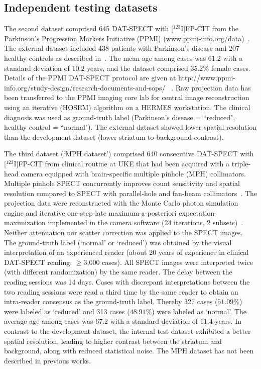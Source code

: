 \subsection{Independent testing datasets}
\label{subsec:external_dataset}

The second dataset comprised 645 DAT-SPECT with [$^{123}$I]FP-CIT from the Parkinson's Progression Markers Initiative (PPMI) 
(www.ppmi-info.org/data)~\citep{Parkinson_Progression_Marker_Initiative2011-px}.
The external dataset included 438 patients with Parkinson's disease and 207 healthy controls as described in~\cite{Wenzel2019}.
The mean age among cases was $61.2$ with a standard deviation of $10.2$ years, 
and the dataset comprised $35.2\%$ female cases.
Details of the PPMI DAT-SPECT protocol are given at http://www.ppmi-info.org/study-design/research-documents-and-sops/ ~\citep{Parkinson_Progression_Marker_Initiative2011-px}. 
Raw projection data has been transferred to the PPMI imaging core lab for central image reconstruction using an iterative (HOSEM) algorithm on a HERMES workstation. 
The clinical diagnosis was used as ground-truth label (Parkinson's disease = ``reduced", healthy control = ``normal"). 
The external dataset showed lower spatial resolution than the development dataset (lower striatum-to-background contrast).

The third dataset (`MPH dataset') comprised 640 consecutive DAT-SPECT with [$^{123}$I]FP-CIT from clinical routine at UKE 
that had been acquired with a triple-head camera equipped with brain-specific multiple pinhole (MPH) collimators. 
Multiple pinhole SPECT concurrently improves count sensitivity and spatial resolution compared to SPECT with parallel-hole 
and fan-beam collimators~\citep{Mathies2022-yi, Tecklenburg2020-xr}.
The projection data were reconstructed with the Monte Carlo photon simulation engine 
and iterative one-step-late maximum-a-posteriori expectation-maximization implemented 
in the camera software (24 iterations, 2 subsets)~\citep{Tecklenburg2020-xr, Magdics2010}.
Neither attenuation nor scatter correction was applied to the SPECT images.
The ground-truth label (`normal' or `reduced') was obtained by the visual interpretation of an experienced reader 
(about 20 years of experience in clinical DAT-SPECT reading, $\geq$3,000 cases).
All SPECT images were interpreted twice (with different randomization) by the same reader. 
The delay between the reading sessions was 14 days. 
Cases with discrepant interpretations between the two reading sessions were read a third time by the same reader 
to obtain an intra-reader consensus as the ground-truth label. 
Thereby 327 cases ($51.09\%$) were labeled as `reduced'  and 313 cases ($48.91\%$) were labeled as `normal'.
The average age among cases was $67.2$ with a standard deviation of $11.4$ years.
In contrast to the development dataset, the internal test dataset exhibited a better spatial resolution, 
leading to higher contrast between the striatum and background, along with reduced statistical noise.
The MPH dataset has not been described in previous works.

